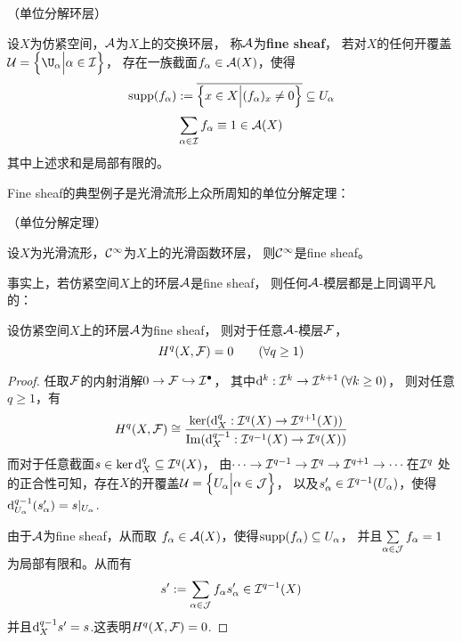\begin{definition}（单位分解环层）%

设$X$为仿紧空间，$\mathcal{A}$为$X$上的交换环层，
称$\mathcal{A}$为\textbf{fine sheaf}，
若对$X$的任何开覆盖$\mcalU=\Bigset{\U_\afa}{\afa\in\mcalI}$，
存在一族截面$f_\alpha\in\mathcal{A}(X)$，使得
$$
  \operatorname{supp}(f_\alpha)
:=
  \overline{\Big\{ x\in X \Big| (f_\alpha)_x\neq 0 \Big\}}
\subseteq U_\alpha
$$
$$
  \sum_{\alpha\in\mathcal{I}}
    f_\alpha
\equiv 1\in\mathcal{A}(X)
$$
其中上述求和是局部有限的。
\end{definition}


Fine sheaf的典型例子是光滑流形上众所周知的单位分解定理：
 
\begin{example}（单位分解定理）

设$X$为光滑流形，$\mathcal{C}^\infty$为$X$上的光滑函数环层，
则$\mathcal{C}^\infty$是fine sheaf。
\end{example}


事实上，若仿紧空间$X$上的环层$\mathcal{A}$是fine sheaf，
则任何$\mathcal{A}$-模层都是上同调平凡的：

\begin{thm}
设仿紧空间$X$上的环层$\mathcal{A}$为fine sheaf，
则对于任意$\mathcal{A}$-模层$\mathcal{F}$，
$$H^q(X,\mathcal{F})=0\qquad (\forall q\geq 1)$$
\end{thm}

\begin{proof}
任取$\mathcal{F}$的内射消解$0\to\mathcal{F}\hookrightarrow\mathcal{I}^{\bullet}$，
其中$\mathrm{d}^k:\mathcal{I}^k\to\mathcal{I}^{k+1}\,(\forall k\geq 0)$，
则对任意$q\geq 1$，有
$$
  H^q(X,\mathcal{F})
\cong
  \frac{\ker(\mathrm{d}^{q}_X:\mathcal{I}^{q}(X)\to\mathcal{I}^{q+1}(X))}
       {\operatorname{Im}(\mathrm{d}^{q-1}_X:\mathcal{I}^{q-1}(X)\to\mathcal{I}^q(X))}
$$
而对于任意截面$s\in\ker\mathrm{d}^q_X\subseteq\mathcal{I}^q(X)$，
由$\cdots\to\mathcal{I}^{q-1}\to\mathcal{I}^q\to\mathcal{I}^{q+1}\to\cdots$在$\mathcal{I}^q$
处的正合性可知，存在$X$的开覆盖$\mathcal{U}=\Big\{ U_\alpha \Big| \alpha\in\mathcal{J} \Big\}$，
以及$s'_\alpha\in\mathcal{I}^{q-1}(U_\alpha)$，使得
$\mathrm{d}^{q-1}_{U_\alpha}(s'_\alpha)=s|_{U_\alpha}$.

由于$\mathcal{A}$为fine sheaf，从而取
$f_\alpha\in\mathcal{A}(X)$，使得$\operatorname{supp}(f_\alpha)\subseteq U_\alpha$，
并且$\sum\limits_{\alpha\in\mathcal{J}}f_\alpha=1$
为局部有限和。从而有
$$
  s':=
  \sum_{\alpha\in\mathcal{J}}
    f_\alpha s_\alpha'
\in\mathcal{I}^{q-1}(X)
$$
并且$\mathrm{d}^{q-1}_Xs'=s$.这表明$H^q(X,\mathcal{F})=0$.
\end{proof}

